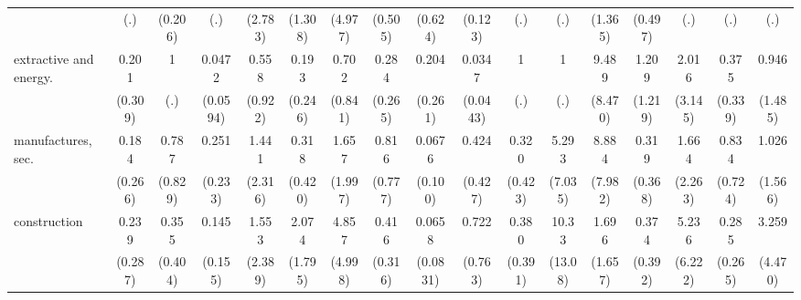{\begin{tabular}{l*{16}{c}}
                    &         (.)         &     (0.206)         &         (.)         &     (2.783)         &     (1.308)         &     (4.977)         &     (0.505)         &     (0.624)         &     (0.123)         &         (.)         &         (.)         &     (1.365)         &     (0.497)         &         (.)         &         (.)         &         (.)         \\
[1em]
extractive and energy.&       0.201         &           1         &      0.0472\sym{*}  &       0.558         &       0.193         &       0.702         &       0.284         &       0.204         &      0.0347\sym{**} &           1         &           1         &       9.489\sym{*}  &       1.209         &       2.016         &       0.375         &       0.946         \\
                    &     (0.309)         &         (.)         &    (0.0594)         &     (0.922)         &     (0.246)         &     (0.841)         &     (0.265)         &     (0.261)         &    (0.0443)         &         (.)         &         (.)         &     (8.470)         &     (1.219)         &     (3.145)         &     (0.339)         &     (1.485)         \\
[1em]
manufactures, sec.  &       0.184         &       0.787         &       0.251         &       1.441         &       0.318         &       1.657         &       0.816         &      0.0676         &       0.424         &       0.320         &       5.293         &       8.884\sym{*}  &       0.319         &       1.664         &       0.834         &       1.026         \\
                    &     (0.266)         &     (0.829)         &     (0.233)         &     (2.316)         &     (0.420)         &     (1.997)         &     (0.777)         &     (0.100)         &     (0.427)         &     (0.423)         &     (7.035)         &     (7.982)         &     (0.368)         &     (2.263)         &     (0.724)         &     (1.566)         \\
[1em]
construction        &       0.239         &       0.355         &       0.145         &       1.553         &       2.074         &       4.857         &       0.416         &      0.0658\sym{*}  &       0.722         &       0.380         &       10.33         &       1.696         &       0.374         &       5.236         &       0.285         &       3.259         \\
                    &     (0.287)         &     (0.404)         &     (0.155)         &     (2.389)         &     (1.795)         &     (4.998)         &     (0.316)         &    (0.0831)         &     (0.763)         &     (0.391)         &     (13.08)         &     (1.657)         &     (0.392)         &     (6.222)         &     (0.265)         &     (4.470)         \\

\end{tabular}}
